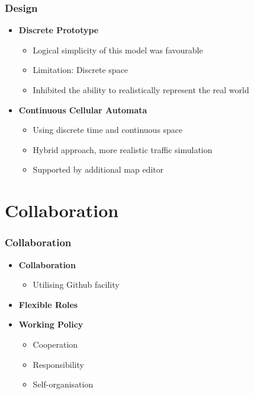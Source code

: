 \documentclass{beamer}
\begin{document}
\begin{frame}
\frametitle{Design}

\begin{itemize}
\item \textbf{Discrete Prototype}
	\begin{itemize}
		\item Logical simplicity of this model was favourable 
		\item Limitation: Discrete space 
		\item Inhibited the ability to realistically represent the real world
	\end{itemize}
\item \textbf{Continuous Cellular Automata}
	\begin{itemize}
		\item Using discrete time and continuous space 
		\item Hybrid approach, more realistic traffic simulation 
		\item Supported by additional map editor
	\end{itemize}
	
\end{itemize}

\end{frame}


\section{Collaboration}

\begin{frame}
\frametitle{Collaboration}

\begin{itemize}
\item \textbf{Collaboration}
	\begin{itemize}
		\item Utilising Github facility 
	\end{itemize}
	
\item \textbf{Flexible Roles}	
	
\item \textbf{Working Policy}
	\begin{itemize}
		\item Cooperation 
		\item Responsibility 
		\item Self-organisation
	\end{itemize}
\end{itemize}
\end{frame}
\end{document}
